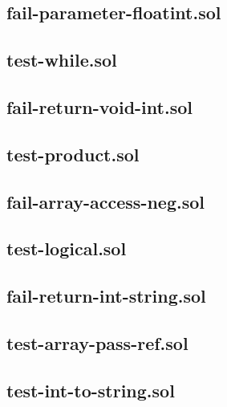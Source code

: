 \subsection{fail-parameter-floatint.sol}


\subsection{test-while.sol}


\subsection{fail-return-void-int.sol}


\subsection{test-product.sol}


\subsection{fail-array-access-neg.sol}


\subsection{test-logical.sol}


\subsection{fail-return-int-string.sol}


\subsection{test-array-pass-ref.sol}


\subsection{test-int-to-string.sol}


